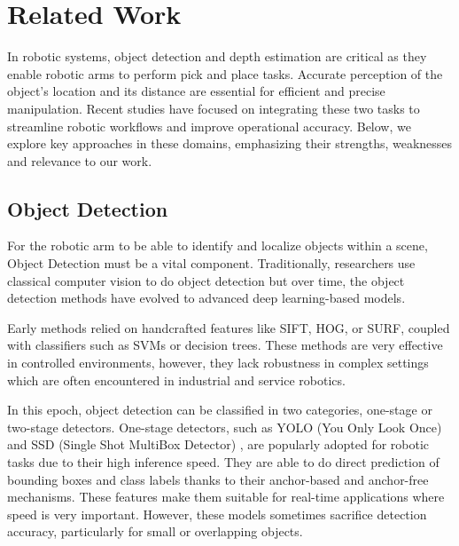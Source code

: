 \section{Related Work}
In robotic systems, object detection and depth estimation are critical as they enable robotic arms to perform pick and place tasks. Accurate perception of the object’s location and its distance are essential for efficient and precise manipulation. Recent studies have focused on integrating these two tasks to streamline robotic workflows and improve operational accuracy.
Below, we explore key approaches in these domains, emphasizing their strengths, weaknesses and relevance to our work.

\vspace{10pt}

\subsection{Object Detection}
For the robotic arm to be able to identify and localize objects within a scene, Object Detection must be a vital component. Traditionally, researchers use classical computer vision to do object detection but over time, the object detection methods have evolved to advanced deep learning-based models.

\vspace{10pt}

Early methods relied on handcrafted features like SIFT, HOG, or SURF, coupled with classifiers such as SVMs or decision trees. These methods are very effective in controlled environments, however, they lack robustness in complex settings which are often encountered in industrial and service robotics.

\vspace{10pt}

In this epoch, object detection can be classified in two categories, one-stage or two-stage detectors. One-stage detectors, such as YOLO (You Only Look Once) \cite{redmon2018yolov3:anincrementalimprovement} and SSD (Single Shot MultiBox Detector) \cite{liu2016ssd:singleshotmultiboxdetector}, are popularly adopted for robotic tasks due to their high inference speed. They are able to do direct prediction of bounding boxes and class labels thanks to their anchor-based and anchor-free mechanisms. These features make them suitable for real-time applications where speed is very important. However, these models sometimes sacrifice detection accuracy, particularly for small or overlapping objects.

